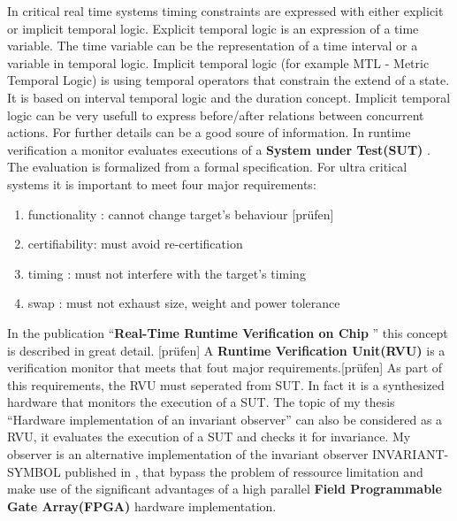 In critical real time systems timing constraints are expressed with either explicit or implicit temporal logic.
Explicit temporal logic is an expression of a time variable. The time variable can be the representation of a time interval or a variable in temporal logic. 
Implicit temporal logic (for example MTL - Metric Temporal Logic) is using temporal operators that constrain the extend of a state.
It is based on interval temporal logic and the duration concept.
Implicit temporal logic can be very usefull to express before/after relations between concurrent actions.
For further details \cite{210306} can be a good soure of information.
In runtime verification a monitor evaluates executions of a \textbf{System under Test(SUT)} \cite{RTFMBJ13}. 
The evaluation is formalized from a formal specification.
For ultra critical systems it is important to meet four major requirements:
\begin{enumerate}
 \item functionality : cannot change target's behaviour [prüfen]
 \item certifiability: must avoid re-certification
 \item timing :	  must not interfere with the target's timing
 \item swap :     must not exhaust size, weight and power tolerance
\end{enumerate}
\newpage
In the publication ``\textbf{Real-Time Runtime Verification on Chip} '' \cite{RTFMBJ13} this concept is described in great detail. [prüfen]\newline
A \textbf{Runtime Verification Unit(RVU)} is a verification monitor that meets that fout major requirements.[prüfen]
As part of this requirements, the RVU must seperated from SUT.
In fact it is a synthesized hardware that monitors the execution of a SUT.\newline
The topic of my thesis ``Hardware implementation of an invariant observer'' can also be considered as a RVU, 
it evaluates the execution of a SUT and checks it for invariance.
My observer is an alternative  implementation of the invariant observer INVARIANT-SYMBOL published in \cite{RTFMBJ13},
that bypass the problem of ressource limitation and make use of the significant advantages of a high parallel
\textbf{Field Programmable Gate Array(FPGA)} hardware implementation.




